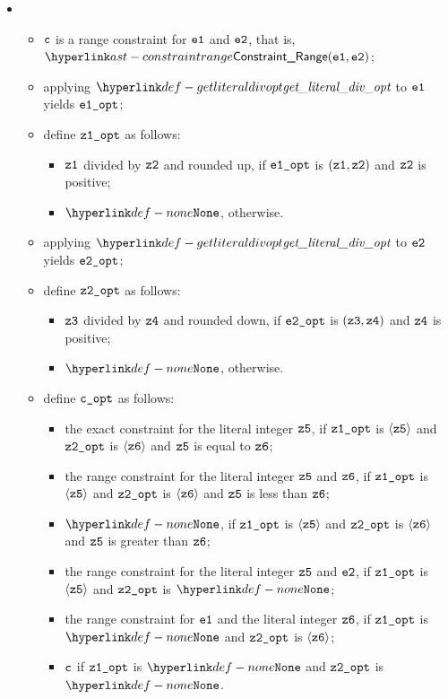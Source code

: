\begin{itemize}
  \item {}
  \begin{itemize}
    \item $\texttt{c}$ is a range constraint for $\texttt{e1}$ and $\texttt{e2}$, that is, $\ConstraintRange(\veone, \vetwo)$;
    \item applying $\getliteraldivopt$ to $\texttt{e1}$ yields $\texttt{e1\_opt}$;
    \item define $\texttt{z1\_opt}$ as follows:
    \begin{itemize}
      \item $\texttt{z1}$ divided by $\texttt{z2}$ and rounded up, if $\texttt{e1\_opt}$ is $(\texttt{z1}, \texttt{z2})$ and $\texttt{z2}$ is positive;
      \item $\None$, otherwise.
    \end{itemize}
    \item applying $\getliteraldivopt$ to $\texttt{e2}$ yields $\texttt{e2\_opt}$;
    \item define $\texttt{z2\_opt}$ as follows:
    \begin{itemize}
      \item $\texttt{z3}$ divided by $\texttt{z4}$ and rounded down, if $\texttt{e2\_opt}$ is $(\texttt{z3}, \texttt{z4})$ and $\texttt{z4}$ is positive;
      \item $\None$, otherwise.
    \end{itemize}
    \item define $\texttt{c\_opt}$ as follows:
    \begin{itemize}
      \item the exact constraint for the literal integer $\texttt{z5}$, if $\texttt{z1\_opt}$ is $\langle\texttt{z5}\rangle$ and $\texttt{z2\_opt}$ is $\langle\texttt{z6}\rangle$ and $\texttt{z5}$ is equal to $\texttt{z6}$;
      \item the range constraint for the literal integer $\texttt{z5}$ and $\texttt{z6}$, if $\texttt{z1\_opt}$ is $\langle\texttt{z5}\rangle$ and $\texttt{z2\_opt}$ is $\langle\texttt{z6}\rangle$ and $\texttt{z5}$ is less than $\texttt{z6}$;
      \item $\None$, if $\texttt{z1\_opt}$ is $\langle\texttt{z5}\rangle$ and $\texttt{z2\_opt}$ is $\langle\texttt{z6}\rangle$ and $\texttt{z5}$ is greater than $\texttt{z6}$;
      \item the range constraint for the literal integer $\texttt{z5}$ and $\texttt{e2}$, if $\texttt{z1\_opt}$ is $\langle\texttt{z5}\rangle$ and $\texttt{z2\_opt}$ is $\None$;
      \item the range constraint for $\texttt{e1}$ and the literal integer $\texttt{z6}$, if $\texttt{z1\_opt}$ is $\None$ and $\texttt{z2\_opt}$ is $\langle\texttt{z6}\rangle$;
      \item $\texttt{c}$ if $\texttt{z1\_opt}$ is $\None$ and $\texttt{z2\_opt}$ is $\None$.
    \end{itemize}
  \end{itemize}
\end{itemize}


